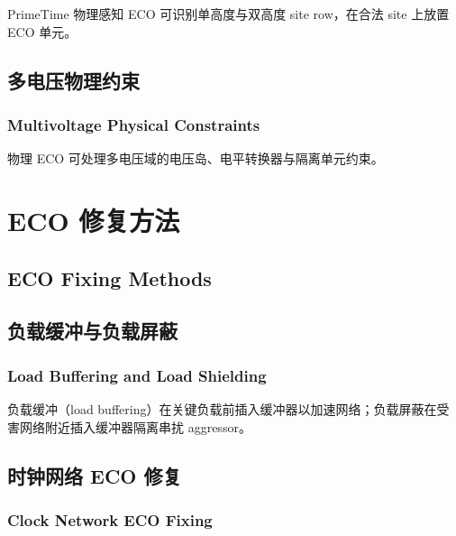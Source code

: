 PrimeTime 物理感知 ECO 可识别单高度与双高度 site row，在合法 site 上放置 ECO 单元。



\subsection{多电压物理约束}
\subsubsection*{Multivoltage Physical Constraints}

物理 ECO 可处理多电压域的电压岛、电平转换器与隔离单元约束。


\section{ECO 修复方法}
\subsection*{ECO Fixing Methods}

\subsection{负载缓冲与负载屏蔽}
\subsubsection*{Load Buffering and Load Shielding}

负载缓冲（load buffering）在关键负载前插入缓冲器以加速网络；负载屏蔽在受害网络附近插入缓冲器隔离串扰 aggressor。



\subsection{时钟网络 ECO 修复}
\subsubsection*{Clock Network ECO Fixing}

